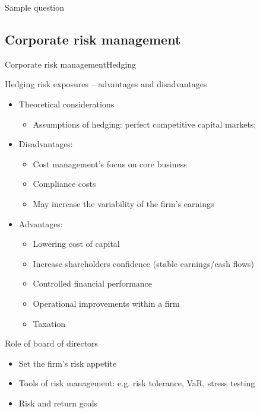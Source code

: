 \begin{frame}[allowframebreaks]{Sample question}
\end{frame}

\subsection{Corporate risk management}

\begin{frame}[allowframebreaks]{Corporate risk management}{Hedging}
	\begin{block}{Hedging risk exposures -- advantages and disadvantages}
		\begin{itemize}
			\item Theoretical considerations
			\begin{itemize}
				\item Assumptions of hedging: perfect competitive capital markets;
			\end{itemize}
			\item Disadvantages:
			\begin{itemize}
				\item Cost management's focus on core business
				\item Compliance costs
				\item May increase the variability of the firm's earnings
			\end{itemize}
			\item Advantages:
			\begin{itemize}
				\item Lowering cost of capital
				\item Increase shareholders confidence (stable earnings/cash flows)
				\item Controlled financial performance
				\item Operational improvements within a firm
				\item Taxation
			\end{itemize}
		\end{itemize}
	\end{block}

	\begin{block}{Role of board of directors}
		\begin{itemize}
			\item Set the firm's risk appetite
			\item Tools of risk management: e.g. risk tolerance, VaR, stress testing
			\item Risk and return goals
		\end{itemize}
	\end{block}


\end{frame}
